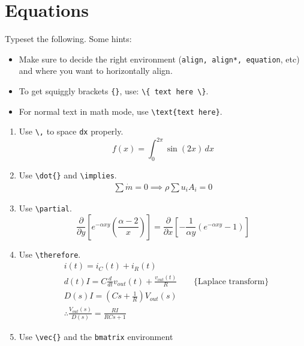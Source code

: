 \section{Equations}
Typeset the following. Some hints:
\begin{itemize}
    \item Make sure to decide the right environment (\texttt{align, align*, equation}, etc) and where you want to horizontally align.
    \item To get squiggly brackets \verb|{}|, use: \verb|\{ text here \}|.
    \item For normal text in math mode, use \verb|\text{text here}|.
\end{itemize}

\begin{enumerate}
    \item Use \verb|\,| to space \verb|dx| properly.
        \begin{equation*}
            f(x) = \int_{0}^{2\pi} \sin(2x) \,dx
        \end{equation*}
    \item Use \verb|\dot{}| and \verb|\implies|.
        \begin{align*}
            \sum \dot{m} = 0 \implies \rho \sum u_i A_i = 0
        \end{align*}
    \item Use \verb|\partial|.
        \begin{equation*}
            \frac{\partial}{\partial y} \left[
                e^{-\alpha xy} \left( \frac{\alpha - 2}{x} \right)
            \right]
            =
            \frac{\partial}{\partial x} \left[
                -\frac{1}{\alpha y} \left(
                    e^{- \alpha xy} - 1
                \right)
            \right]
        \end{equation*}
    \item Use \verb|\therefore|.
        \begin{align*}
            & i(t) = i_C(t) + i_R(t) \\
            & d(t)I = C \frac{d}{dt}v_{out}(t) + \frac{v_{out}(t)}{R} \qquad \{\text{Laplace transform}\} \\
            & D(s)I = \left( Cs + \frac{1}{R} \right)V_{out}(s) \\
            & \therefore \frac{V_{out}(s)}{D(s)} = \frac{RI}{RCs+1}
        \end{align*}
    \item Use \verb|\vec{}| and the \verb|bmatrix| environment
    \begin{equation*}

\end{equation*}
\end{enumerate}
